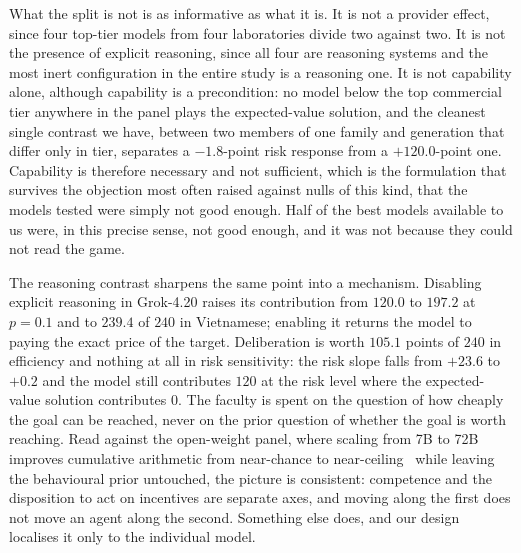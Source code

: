 \documentclass[openacc]{rsproca_new}
\begin{document}
What the split is not is as informative as what it is. It is not a provider effect, since four top-tier models from four laboratories divide two against two. It is not the presence of explicit reasoning, since all four are reasoning systems and the most inert configuration in the entire study is a reasoning one. It is not capability alone, although capability is a precondition: no model below the top commercial tier anywhere in the panel plays the expected-value solution, and the cleanest single contrast we have, between two members of one family and generation that differ only in tier, separates a $-1.8$-point risk response from a $+120.0$-point one. Capability is therefore necessary and not sufficient, which is the formulation that survives the objection most often raised against nulls of this kind, that the models tested were simply not good enough. Half of the best models available to us were, in this precise sense, not good enough, and it was not because they could not read the game.

The reasoning contrast sharpens the same point into a mechanism. Disabling explicit reasoning in Grok-4.20 raises its contribution from $120.0$ to $197.2$ at $p=0.1$ and to $239.4$ of $240$ in Vietnamese; enabling it returns the model to paying the exact price of the target. Deliberation is worth $105.1$ points of $240$ in efficiency and nothing at all in risk sensitivity: the risk slope falls from $+23.6$ to $+0.2$ and the model still contributes $120$ at the risk level where the expected-value solution contributes $0$. The faculty is spent on the question of how cheaply the goal can be reached, never on the prior question of whether the goal is worth reaching. Read against the open-weight panel, where scaling from 7B to 72B improves cumulative arithmetic from near-chance to near-ceiling~\cite{wei2022emergent} while leaving the behavioural prior untouched, the picture is consistent: competence and the disposition to act on incentives are separate axes, and moving along the first does not move an agent along the second. Something else does, and our design localises it only to the individual model.
\end{document}
